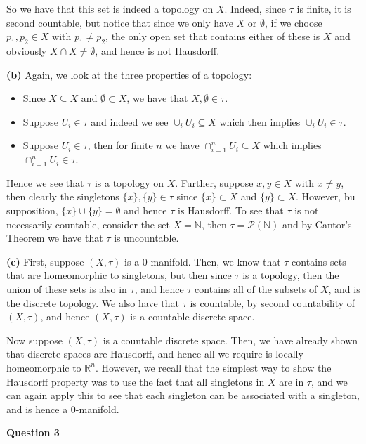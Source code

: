 \documentclass[10pt]{article}
\newcommand{\R}{\mathbb{R}}
\newcommand{\N}{\mathbb{N}}
\begin{document}
So we have that this set is indeed a topology on $X$. Indeed, since $\tau$ is finite, it is second countable, but notice that since we only have $X$ or $\emptyset$, if we choose $p_{1},p_{2}\in X$ with $p_{1} \neq p_{2}$, the only open set that contains either of these is $X$ and obviously $X\cap X \neq \emptyset$, and hence is not Hausdorff.

\textbf{(b)} Again, we look at the three properties of a topology:
\begin{itemize}
\item Since $X\subseteq X$ and $\emptyset \subset X$, we have that $X,\emptyset \in \tau$.
\item Suppose $U_{i} \in \tau$ and indeed we see $\cup_{i}U_{i} \subseteq X$ which then implies $\cup_{i}U_{i} \in \tau$.
\item Suppose $U_{i} \in \tau$, then for finite $n$ we have $\cap_{i=1}^{n}U_{i} \subseteq X$ which implies $\cap_{i=1}^{n}U_{i} \in \tau$.
\end{itemize}

Hence we see that $\tau$ is a topology on $X$. Further, suppose $x,y\in X$ with $x \neq y$, then clearly the singletons $\{x\},\{y\} \in \tau$ since $\{x\} \subset X$ and $\{y\} \subset X$. However, bu supposition, $\{x\} \cup \{y\} = \emptyset$ and hence $\tau$ is Hausdorff. To see that $\tau$ is not necessarily countable, consider the set $X = \N$, then $\tau = \mathcal{P}(\N)$ and by Cantor's Theorem we have that $\tau$ is uncountable.

\textbf{(c)} First, suppose $(X,\tau)$ is a 0-manifold. Then, we know that $\tau$ contains sets that are homeomorphic to singletons, but then since $\tau$ is a topology, then the union of these sets is also in $\tau$, and hence $\tau$ contains all of the subsets of $X$, and is the discrete topology. We also have that $\tau$ is countable, by second countability of $(X,\tau)$, and hence $(X,\tau)$ is a countable discrete space.

Now suppose $(X,\tau)$ is a countable discrete space. Then, we have already shown that discrete spaces are Hausdorff, and hence all we require is locally homeomorphic to $\R^{n}$. However, we recall that the simplest way to show the Hausdorff property was to use the fact that all singletons in $X$ are in $\tau$, and we can again apply this to see that each singleton can be associated with a singleton, and is hence a 0-manifold.

\newpage

\textbf{Question 3}
\end{document}
